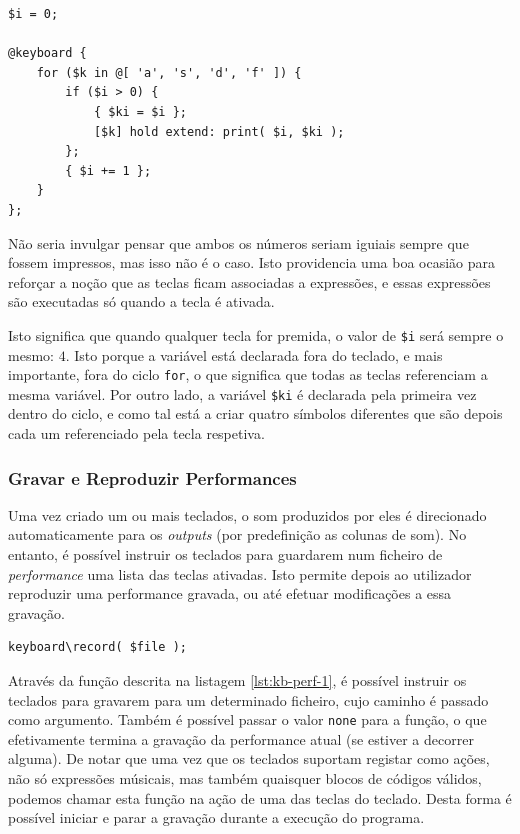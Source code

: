 \begin{lstlisting}[caption={Declaração de teclado dinâmica recorrendo ao uso de ciclos, condicionais e blocos de código.}]
$i = 0;

@keyboard {
    for ($k in @[ 'a', 's', 'd', 'f' ]) {
        if ($i > 0) {
            { $ki = $i };
            [$k] hold extend: print( $i, $ki );
        };
        { $i += 1 };
    }
};
\end{lstlisting}

Não seria invulgar pensar que ambos os números seriam iguiais sempre que fossem impressos, mas isso não é o caso. Isto providencia uma boa ocasião para reforçar a noção que as teclas ficam associadas a expressões, e essas expressões são executadas só quando a tecla é ativada.

Isto significa que quando qualquer tecla for premida, o valor de \texttt{\$i} será sempre o mesmo: $4$. Isto porque a variável está declarada fora do teclado, e mais importante, fora do ciclo \texttt{for}, o que significa que todas as teclas referenciam a mesma variável. Por outro lado, a variável \texttt{\$ki} é declarada pela primeira vez dentro do ciclo, e como tal está a criar quatro símbolos diferentes que são depois cada um referenciado pela tecla respetiva.

\subsubsection{Gravar e Reproduzir Performances}
Uma vez criado um ou mais teclados, o som produzidos por eles é direcionado automaticamente para os \textit{outputs} (por predefinição as colunas de som). No entanto, é possível instruir os teclados para guardarem num ficheiro de \textit{performance} uma lista das teclas ativadas. Isto permite depois ao utilizador reproduzir uma performance gravada, ou até efetuar modificações a essa gravação.

\begin{lstlisting}[caption={Gravação de uma \textit{performance}},label={lst:kb-perf-1}]
keyboard\record( $file );
\end{lstlisting}

Através da função descrita na listagem \ref{lst:kb-perf-1}, é possível instruir os teclados para gravarem para um determinado ficheiro, cujo caminho é passado como argumento. Também é possível passar o valor \texttt{none} para a função, o que efetivamente termina a gravação da performance atual (se estiver a decorrer alguma).
De notar que uma vez que os teclados suportam registar como ações, não só expressões músicais, mas também quaisquer blocos de códigos válidos, podemos chamar esta função na ação de uma das teclas do teclado. Desta forma é possível iniciar e parar a gravação durante a execução do programa.

